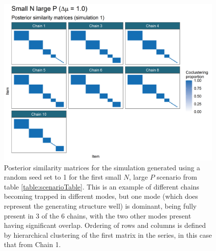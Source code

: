 \documentclass[]{article}
\begin{document}
\begin{figure} %
	\centering
	\includegraphics[scale=0.65]{./Images/Simulations/PSMs/small_n_large_p_baseSim1.png}
	\caption{Posterior similarity matrices for the simulation generated using a random seed set to 1 for the first small $N$, large $P$ scenario from table \ref{table:scenarioTable}. This is an example of different chains becoming trapped in different modes, but one mode (which does represent the generating structure well) is dominant, being fully present in 3 of the 6 chains, with the two other modes present having significant overlap. Ordering of rows and columns is defined by hierarchical clustering of the first matrix in the series, in this case that from Chain 1.}
	\label{fig:simPSMsDisagreeExample}
\end{figure}
\end{document}
